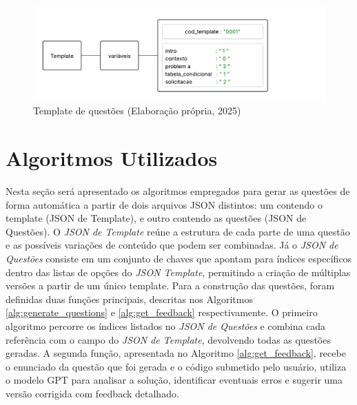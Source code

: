 \begin{figure}[ht]
	\centering
	\includegraphics[width=18cm]{./imagens/capitulo5/template-2}
	\caption{Template de questões (Elaboração própria, 2025) }
	\label{fig:template-2}
\end{figure}

\section{Algoritmos Utilizados}

Nesta seção será apresentado os algoritmos empregados para gerar as questões de forma automática a partir de dois arquivos JSON distintos: um contendo o template (JSON de Template), e outro contendo as questões (JSON de Questões). O \textit{JSON de Template} reúne a estrutura de cada parte de uma questão e as possíveis variações de conteúdo que podem ser combinadas. Já o \textit{JSON de Questões} consiste em um conjunto de chaves que apontam para índices específicos dentro das listas de opções do \textit{JSON Template}, permitindo a criação de múltiplas versões a partir de um único template. 
Para a construção das questões, foram definidas duas funções principais, descritas nos Algoritmos \ref{alg:generate_questions} e \ref{alg:get_feedback}  respectivamente.   
O primeiro algoritmo percorre os índices listados no \textit{JSON de Questões} e combina cada referência com o campo do \textit{JSON de Template}, devolvendo todas as questões geradas.  
A segunda função, apresentada no Algoritmo \ref{alg:get_feedback}, recebe o enunciado da questão que foi gerada e o código submetido pelo usuário, utiliza o modelo GPT para analisar a solução, identificar eventuais erros e sugerir uma versão corrigida com feedback detalhado.

